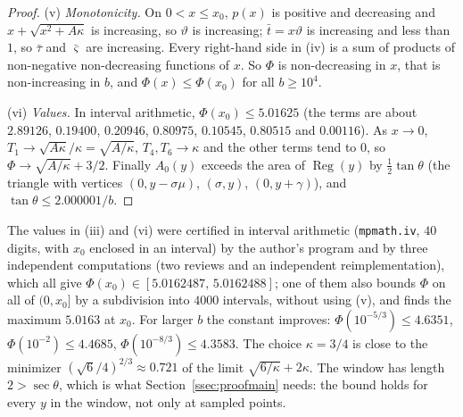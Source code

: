 \documentclass[11pt]{amsart}
\newcommand{\Reg}{\operatorname{Reg}}
\theoremstyle{definition}
\theoremstyle{remark}
\numberwithin{equation}{section}
\begin{document}
\begin{proof}
(v) \emph{Monotonicity.} On $0<x\le x_0$, $p(x)$ is positive and decreasing and $x+\sqrt{x^2+A\kappa}$ is increasing,
so $\vartheta$ is increasing; $\bar t=x\vartheta$ is increasing and less than $1$, so $\bar\tau$ and $\bar\varsigma$ are
increasing. Every right-hand side in (iv) is a sum of products of non-negative non-decreasing functions of $x$. So
$\Phi$ is non-decreasing in $x$, that is non-increasing in $b$, and $\Phi(x)\le\Phi(x_0)$ for all $b\ge10^4$.

(vi) \emph{Values.} In interval arithmetic, $\Phi(x_0)\le5.01625$ (the terms are about $2.89126$, $0.19400$,
$0.20946$, $0.80975$, $0.10545$, $0.80515$ and $0.00116$). As $x\to0$, $T_1\to\sqrt{A\kappa}/\kappa=\sqrt{A/\kappa}$,
$T_4,T_6\to\kappa$ and the other terms tend to $0$, so $\Phi\to\sqrt{A/\kappa}+3/2$. Finally $A_0(y)$ exceeds the area
of $\Reg(y)$ by $\frac12\tan\theta$ (the triangle with vertices $(0,y-\sigma\mu)$, $(\sigma,y)$, $(0,y+\gamma)$), and
$\tan\theta\le2.000001/b$.
\end{proof}

The values in (iii) and (vi) were certified in interval arithmetic (\texttt{mpmath.iv}, $40$ digits, with $x_0$
enclosed in an interval) by the author's program and by three independent computations (two reviews and an
independent reimplementation), which all give $\Phi(x_0)\in[5.0162487,\,5.0162488]$; one of them also
bounds $\Phi$ on all of $(0,x_0]$ by a subdivision into $4000$ intervals, without using (v), and finds the maximum
$5.0163$ at $x_0$. For larger $b$ the constant improves: $\Phi(10^{-5/3})\le4.6351$, $\Phi(10^{-2})\le4.4685$,
$\Phi(10^{-8/3})\le4.3583$. The choice $\kappa=3/4$ is close to the minimizer $(\sqrt6/4)^{2/3}\approx0.721$ of the
limit $\sqrt{6/\kappa}+2\kappa$. The window has length $2>\sec\theta$, which is what Section~\ref{ssec:proofmain}
needs: the bound holds for every $y$ in the window, not only at sampled points.
\end{document}
